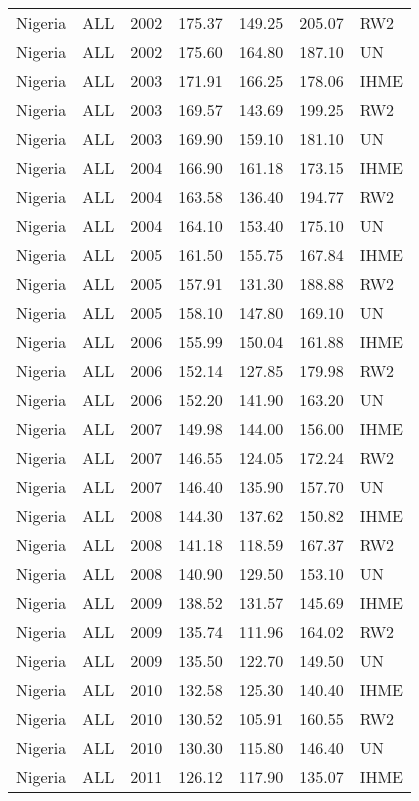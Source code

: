 \begin{longtable}{lllrrrl}
  Nigeria & ALL & 2002 & 175.37 & 149.25 & 205.07 & RW2 \\ 
  Nigeria & ALL & 2002 & 175.60 & 164.80 & 187.10 & UN \\ 
  Nigeria & ALL & 2003 & 171.91 & 166.25 & 178.06 & IHME \\ 
  Nigeria & ALL & 2003 & 169.57 & 143.69 & 199.25 & RW2 \\ 
  Nigeria & ALL & 2003 & 169.90 & 159.10 & 181.10 & UN \\ 
  Nigeria & ALL & 2004 & 166.90 & 161.18 & 173.15 & IHME \\ 
  Nigeria & ALL & 2004 & 163.58 & 136.40 & 194.77 & RW2 \\ 
  Nigeria & ALL & 2004 & 164.10 & 153.40 & 175.10 & UN \\ 
  Nigeria & ALL & 2005 & 161.50 & 155.75 & 167.84 & IHME \\ 
  Nigeria & ALL & 2005 & 157.91 & 131.30 & 188.88 & RW2 \\ 
  Nigeria & ALL & 2005 & 158.10 & 147.80 & 169.10 & UN \\ 
  Nigeria & ALL & 2006 & 155.99 & 150.04 & 161.88 & IHME \\ 
  Nigeria & ALL & 2006 & 152.14 & 127.85 & 179.98 & RW2 \\ 
  Nigeria & ALL & 2006 & 152.20 & 141.90 & 163.20 & UN \\ 
  Nigeria & ALL & 2007 & 149.98 & 144.00 & 156.00 & IHME \\ 
  Nigeria & ALL & 2007 & 146.55 & 124.05 & 172.24 & RW2 \\ 
  Nigeria & ALL & 2007 & 146.40 & 135.90 & 157.70 & UN \\ 
  Nigeria & ALL & 2008 & 144.30 & 137.62 & 150.82 & IHME \\ 
  Nigeria & ALL & 2008 & 141.18 & 118.59 & 167.37 & RW2 \\ 
  Nigeria & ALL & 2008 & 140.90 & 129.50 & 153.10 & UN \\ 
  Nigeria & ALL & 2009 & 138.52 & 131.57 & 145.69 & IHME \\ 
  Nigeria & ALL & 2009 & 135.74 & 111.96 & 164.02 & RW2 \\ 
  Nigeria & ALL & 2009 & 135.50 & 122.70 & 149.50 & UN \\ 
  Nigeria & ALL & 2010 & 132.58 & 125.30 & 140.40 & IHME \\ 
  Nigeria & ALL & 2010 & 130.52 & 105.91 & 160.55 & RW2 \\ 
  Nigeria & ALL & 2010 & 130.30 & 115.80 & 146.40 & UN \\ 
  Nigeria & ALL & 2011 & 126.12 & 117.90 & 135.07 & IHME \\ 

\end{longtable}
